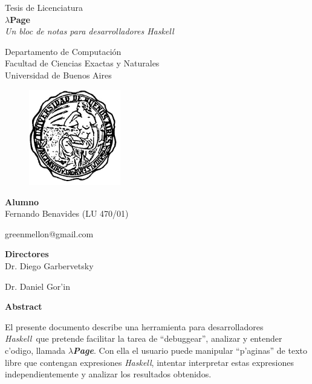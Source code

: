 \documentclass[a4paper]{article}
\newcommand{\haskell}{\textsl{Haskell}}
\newcommand{\hpage}{\textbf{\textsl{$\lambda$Page}}}
\begin{document}
    \thispagestyle{empty}
    \begin{center}
	    {\Large Tesis de Licenciatura}\\[1em]
	    {\huge \textbf{$\lambda$Page}}\\[0.5em]
	    {\large \textit{Un bloc de notas para desarrolladores Haskell}}\\[1em]
	    \par{}
	    {\large Departamento de Computaci\'on}\\[0.5em]
	    {\large Facultad de Ciencias Exactas y Naturales}\\[0.5em]
	    {\large Universidad de Buenos Aires}
	    \par{}
	    \begin{figure}[h]
	        \begin{center}
	        \includegraphics[width=40mm]{pictures/logoUba}
	        \end{center}
	    \end{figure}
	    {\Large \textbf{Alumno}}\\[0.8em]
	    {\Large Fernando Benavides (LU 470/01)} \par
	    {\Large greenmellon@gmail.com} \par
	    \par{}
	    {\Large \textbf{Directores}}\\[0.8em]
	    {\Large Dr. Diego Garbervetsky} \par
	    {\Large Dr. Daniel Gor'in} \par
	    \par{}
         {\Large \textbf{Abstract}}\\[0.5em]
    \end{center}
    El presente documento describe una herramienta para desarrolladores \haskell\ que pretende facilitar la tarea de ``debuggear'', analizar y entender c'odigo, llamada \hpage.  Con ella el usuario puede manipular ``p'aginas'' de texto libre que contengan expresiones \haskell, intentar interpretar estas expresiones independientemente y analizar los resultados obtenidos.
    \newpage
\end{document}
